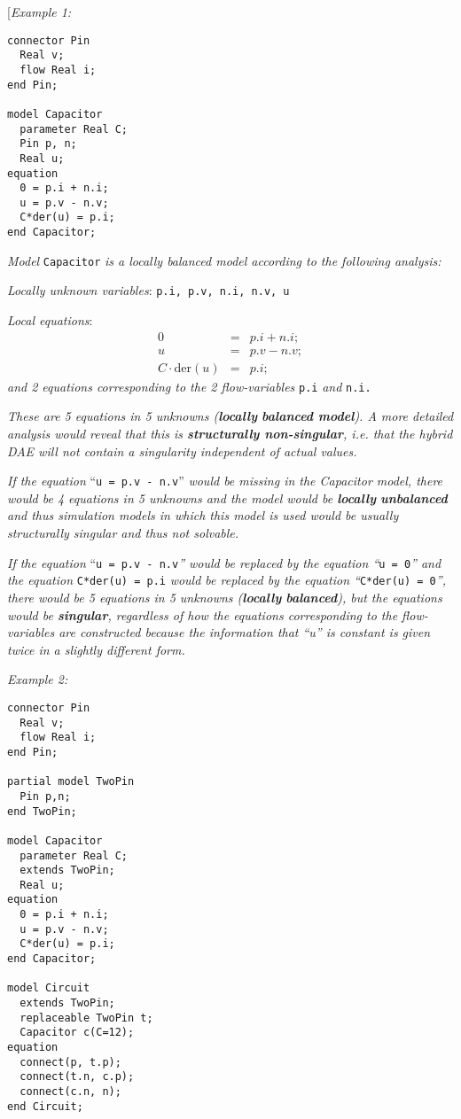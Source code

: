 {[}\emph{Example 1:}
\begin{lstlisting}[language=modelica]
connector Pin
  Real v;
  flow Real i;
end Pin;

model Capacitor
  parameter Real C;
  Pin p, n;
  Real u;
equation
  0 = p.i + n.i; 
  u = p.v - n.v;
  C*der(u) = p.i; 
end Capacitor;
\end{lstlisting}

\emph{Model} \lstinline!Capacitor! \emph{is a locally balanced model according to
the following analysis:}

\emph{Locally unknown variables}: \lstinline!p.i, p.v, n.i, n.v, u!

\emph{Local equations}: 
\begin{eqnarray*}
0 &=& p.i + n.i;\\
u &=& p.v - n.v;\\
C \cdot \text{der}(u) &=& p.i;
\end{eqnarray*}
\emph{and 2 equations corresponding to the 2 flow-variables} \lstinline!p.i!
\emph{and} \lstinline!n.i.!

\emph{These are 5 equations in 5 unknowns (\textbf{locally}
\textbf{balanced model}). A more detailed analysis would reveal that
this is \textbf{structurally non-singular}, i.e. that the hybrid DAE
will not contain a singularity independent of actual values.}

\emph{If the equation} ``\lstinline!u = p.v - n.v!'' \emph{would be missing in the
Capacitor model, there would be 4 equations in 5 unknowns and the model
would be \textbf{locally} \textbf{unbalanced} and thus simulation models
in which this model is used would be usually structurally singular and
thus not solvable.}

\emph{If the equation} ``\lstinline!u = p.v - n.v!\emph{'' would be replaced by the
equation ``}\lstinline!u = 0!\emph{'' and the equation} \lstinline!C*der(u) = p.i! \emph{would
be replaced by the equation ``}\lstinline!C*der(u) = 0!\emph{'', there would be 5
equations in 5 unknowns (\textbf{locally} \textbf{balanced}), but the
equations would be \textbf{singular}, regardless of how the equations
corresponding to the flow-variables are constructed because the
information that ``u'' is constant is given twice in a slightly
different form.}

\emph{Example 2:}

\begin{lstlisting}[language=modelica]
connector Pin
  Real v;
  flow Real i;
end Pin;

partial model TwoPin
  Pin p,n;
end TwoPin;

model Capacitor
  parameter Real C;
  extends TwoPin;
  Real u;
equation
  0 = p.i + n.i; 
  u = p.v - n.v;
  C*der(u) = p.i; 
end Capacitor;

model Circuit
  extends TwoPin;
  replaceable TwoPin t;
  Capacitor c(C=12);
equation
  connect(p, t.p);
  connect(t.n, c.p);
  connect(c.n, n);
end Circuit;
\end{lstlisting}

